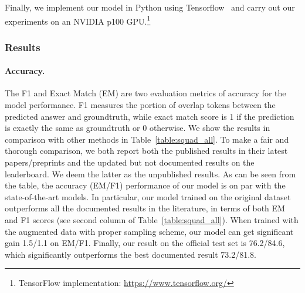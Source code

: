 \documentclass{article} \usepackage{iclr2018_conference,times}
\begin{document}
Finally, we implement our model in Python using Tensorflow~\citep{AbadiABBCCCDDDG16} and carry out our experiments on an NVIDIA p100 GPU.\footnote{TensorFlow implementation: \url{https://www.tensorflow.org/}}


\subsubsection{Results}
\paragraph{Accuracy.}
The F1 and Exact Match (EM) are two evaluation metrics of accuracy for the model performance. F1 measures the portion of overlap tokens between the predicted answer and groundtruth, while exact match score is 1 if the prediction is exactly the same as groundtruth or 0 otherwise. We show the results in comparison with other methods in Table~\ref{table:squad_all}. To make a fair and thorough comparison, we both report both the published results in their latest papers/preprints and the updated but not documented results on the leaderboard. We deem the latter as the unpublished results. As can be seen from the table, the accuracy (EM/F1) performance of our model is on par with the state-of-the-art models. In particular, our model trained on the original dataset outperforms all the documented results in the literature, in terms of both EM and F1 scores (see second column of Table~\ref{table:squad_all}). When trained with the augmented data with proper sampling scheme, our model can get significant gain 1.5/1.1 on EM/F1. Finally, our result on the official test set is 76.2/84.6, which significantly outperforms the best documented result 73.2/81.8. 
\end{document}
